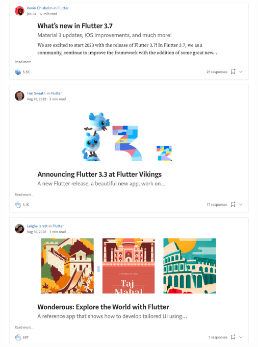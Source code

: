 \Continuing
\begin{center}
    \includegraphics[width=35em]{flutter-article-claps-p3}
\end{center}

\pagebreak
